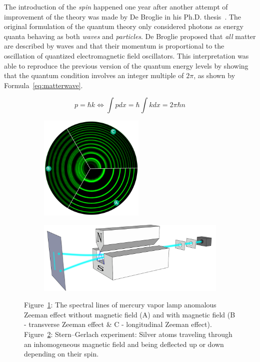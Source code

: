 	The introduction of the \textit{spin} happened one year after another attempt of improvement of the theory was made by De Broglie in his Ph.D. thesis~\cite{DEBROGLIE1924}. The original formulation of the quantum theory only considered photons as energy quanta behaving as both \textit{waves} and \textit{particles}. De Broglie proposed that \textit{all} matter are described by waves and that their momentum is proportional to the oscillation of quantized electromagnetic field oscillators. This interpretation was able to reproduce the previous version of the quantum energy levels by showing that the quantum condition involves an integer multiple of $2\pi$, as shown by Formula~\ref{eq:matterwave}.
	
	\begin{equation}
		\label{eq:matterwave}
		p = \hbar k \Leftrightarrow \int p dx = \hbar\int k dx = 2\pi\hbar n
	\end{equation}
	
\endgroup
	
	\begin{figure}[H]
		\begin{subfigure}{\linewidth}
			\centering
			\includegraphics[height=5cm]{fig/chapt2/ZeemanEffectIllus.png}
			\caption{\label{fig:spin:A}}
		\end{subfigure}
		\begin{subfigure}{\linewidth}
			\centering
			\includegraphics[width = \plotwidth]{fig/chapt2/Stern-Gerlach_experiment.pdf}
			\caption{\label{fig:spin:B}}
		\end{subfigure}
		\caption{\label{fig:spin} Figure~\ref{fig:spin:A}: The spectral lines of mercury vapor lamp anomalous Zeeman effect without magnetic field (A) and with magnetic field (B - transverse Zeeman effect \& C - longitudinal Zeeman effect). Figure~\ref{fig:spin:B}: Stern–Gerlach experiment: Silver atoms traveling through an inhomogeneous magnetic field and being deflected up or down depending on their spin.}
	\end{figure}
	
